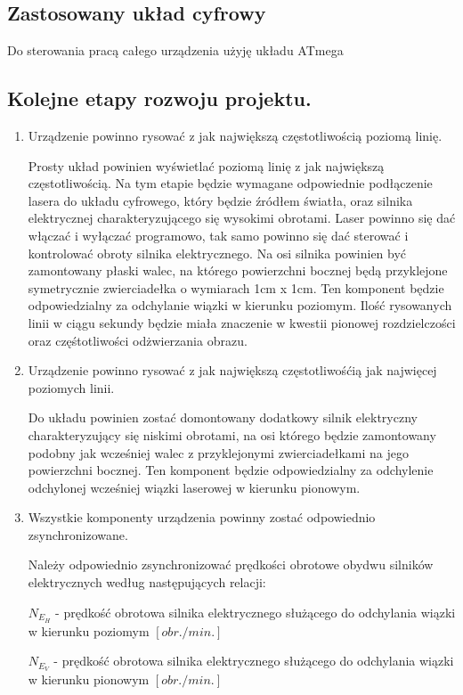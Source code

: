\documentclass[a4paper,oneside,11pt]{report}
\begin{document}
\subsection{Zastosowany układ cyfrowy}
Do sterowania pracą całego urządzenia użyję układu ATmega

\subsection{Kolejne etapy rozwoju projektu.}
\begin{enumerate}[1.]
\item Urządzenie powinno rysować z jak największą częstotliwością poziomą linię.

Prosty układ powinien wyświetlać poziomą linię z jak największą częstotliwością. Na tym etapie będzie wymagane odpowiednie podłączenie lasera do układu cyfrowego, który będzie źródłem światła, oraz silnika elektrycznej charakteryzującego się wysokimi obrotami. Laser powinno się dać włączać i wyłączać programowo, tak samo powinno się dać sterować i kontrolować obroty silnika elektrycznego. Na osi silnika powinien być zamontowany płaski walec, na którego powierzchni bocznej będą przyklejone symetrycznie zwierciadełka o wymiarach 1cm x 1cm. Ten komponent będzie odpowiedzialny za odchylanie wiązki w kierunku poziomym. Ilość rysowanych linii w ciągu sekundy będzie miała znaczenie w kwestii pionowej rozdzielczości oraz częśtotliwości odżwierzania obrazu.

\item Urządzenie powinno rysować z jak największą częstotliwośćią jak najwięcej poziomych linii.

Do układu powinien zostać domontowany dodatkowy silnik elektryczny charakteryzujący się niskimi obrotami, na osi którego będzie zamontowany podobny jak wcześniej walec z przyklejonymi zwierciadełkami na jego powierzchni bocznej. Ten komponent będzie odpowiedzialny za odchylenie odchylonej wcześniej wiązki laserowej w kierunku pionowym.

\item Wszystkie komponenty urządzenia powinny zostać odpowiednio zsynchronizowane.

Należy odpowiednio zsynchronizować prędkości obrotowe obydwu silników elektrycznych według następujących relacji:

$N_E_H$ - prędkość obrotowa silnika elektrycznego służącego do odchylania wiązki w kierunku poziomym $[obr./min.]$

$N_E_V$ - prędkość obrotowa silnika elektrycznego służącego do odchylania wiązki w kierunku pionowym $[obr./min.]$


\end{enumerate}
\end{document}
